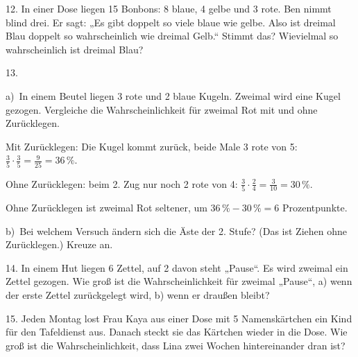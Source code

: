 \documentclass[11pt]{article}
\newcommand{\grau}[1]{{\color{mbgrau}#1}}
\begin{document}
\begin{pfaufg}{}{12.}{}
In einer Dose liegen 15 Bonbons: 8 blaue, 4 gelbe und 3 rote. Ben nimmt blind drei. Er sagt: „Es gibt doppelt so viele blaue wie gelbe. Also ist dreimal Blau doppelt so wahrscheinlich wie dreimal Gelb.“ Stimmt das? Wievielmal so wahrscheinlich ist dreimal Blau?
\end{pfaufg}

\begin{pfaufg}{}{13.}{}
\grau{a)\ In einem Beutel liegen 3 rote und 2 blaue Kugeln. Zweimal wird eine Kugel gezogen. Vergleiche die Wahrscheinlichkeit für zweimal Rot mit und ohne Zurücklegen.\par\smallskip Mit Zurücklegen: Die Kugel kommt zurück, beide Male 3 rote von 5: $\frac{3}{5} \cdot \frac{3}{5} = \frac{9}{25} = 36\,\%$.\par Ohne Zurücklegen: beim 2. Zug nur noch 2 rote von 4: $\frac{3}{5} \cdot \frac{2}{4} = \frac{3}{10} = 30\,\%$.\par Ohne Zurücklegen ist zweimal Rot seltener, um $36\,\% - 30\,\% = 6$ Prozentpunkte.}
\par\medskip
b)\ Bei welchem Versuch ändern sich die Äste der 2. Stufe? (Das ist Ziehen ohne Zurücklegen.) Kreuze an.
\end{pfaufg}

\begin{pfaufg}{}{14.}{}
In einem Hut liegen 6 Zettel, auf 2 davon steht „Pause“. Es wird zweimal ein Zettel gezogen. Wie groß ist die Wahrscheinlichkeit für zweimal „Pause“, a) wenn der erste Zettel zurückgelegt wird, b) wenn er draußen bleibt?
\end{pfaufg}

\begin{pfaufg}{}{15.}{}
Jeden Montag lost Frau Kaya aus einer Dose mit 5 Namenskärtchen ein Kind für den Tafeldienst aus. Danach steckt sie das Kärtchen wieder in die Dose. Wie groß ist die Wahrscheinlichkeit, dass Lina zwei Wochen hintereinander dran ist?
\end{pfaufg}
\end{document}
